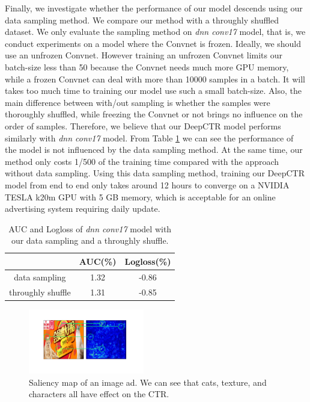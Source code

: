 \documentclass{sig-alternate}
\begin{document}
Finally, we investigate whether the performance of our model descends using our data sampling method. We compare our method with a throughly shuffled dataset. We only evaluate the sampling method on  \emph{dnn conv17} model, that is, we conduct experiments on a model where the Convnet is frozen. Ideally, we should use an unfrozen Convnet. However training an unfrozen Convnet limits our batch-size less than 50  because the Convnet needs much more GPU memory, while a frozen Convnet can deal with more than 10000 samples in a batch. It will takes too much time to training our model use such a small batch-size. Also, the main difference between with/out sampling is whether the samples were thoroughly shuffled, while freezing the Convnet or not brings no influence on the order of samples. Therefore, we believe that our  DeepCTR model performs similarly with \emph{dnn conv17} model. From Table \ref{table:datasampling} we can see the performance of the model is not influenced by the data sampling method. At the same time, our method only costs 1/500 of the training time compared with the approach without data sampling. Using this data sampling method, training our DeepCTR model from end to end only takes around 12 hours to converge on a NVIDIA TESLA k20m GPU with 5 GB memory, which is acceptable for an online advertising system requiring daily update. 
\begin{table}
	\centering
	\caption{AUC and Logloss of \emph{dnn conv17} model with our data sampling and a throughly shuffle.}
	\label{table:datasampling}
	\begin{tabular}{|c|c|c|} \hline
		& AUC(\%) & Logloss(\%)\\ \hline
		data sampling & 1.32 & -0.86\\ \hline
		throughly shuffle & 1.31 & -0.85\\ \hline
	\end{tabular}
\end{table}

\begin{figure}
	\centering
	\includegraphics[width=0.45\textwidth]{vis_compare}
	\caption{Saliency map of an image ad. We can see that cats, texture, and characters all have effect on the CTR. }
	\label{fig:vis_compare}
\end{figure}
\end{document}
